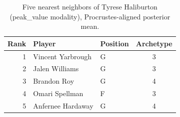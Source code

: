 \begin{table}[htbp]
  \centering\small
  \begin{tabular}{rllc}
    \toprule
    Rank & Player & Position & Archetype \\
    \midrule
    1 & Vincent Yarbrough & G & 3 \\
    2 & Jalen Williams & G & 3 \\
    3 & Brandon Roy & G & 4 \\
    4 & Omari Spellman & F & 3 \\
    5 & Anfernee Hardaway & G & 4 \\
    \bottomrule
  \end{tabular}
  \caption{Five nearest neighbors of Tyrese Haliburton (peak_value modality), Procrustes-aligned posterior mean.}
  \label{tab:Tyrese_Haliburton_neighbors_peak_value}
\end{table}

